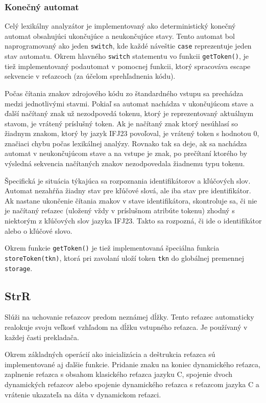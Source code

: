 \documentclass[a4paper,11pt]{article}
\begin{document}
\subsubsection{Konečný automat}
Celý lexikálny analyzátor je implementovaný ako deterministický konečný automat obsahujúci ukončujúce a neukončujúce stavy. Tento automat bol naprogramovaný ako jeden \texttt{switch}, kde každé náveštie \texttt{case} reprezentuje jeden stav automatu. Okrem hlavného \texttt{switch} statementu vo funkcii \texttt{getToken()}, je tiež implementovaný podautomat v pomocnej funkcii, ktorý spracováva escape sekvencie v reťazcoch (za účelom sprehľadnenia kódu).

Počas čítania znakov zdrojového kódu zo štandardného vstupu sa prechádza medzi jednotlivými stavmi. Pokiaľ sa automat nachádza v ukončujúcom stave a ďalší načítaný znak už nezodpovedá tokenu, ktorý je reprezentovaný aktuálnym stavom, je vrátený príslušný token. Ak je načítaný znak ktorý nesúhlasí so žiadnym znakom, ktorý by jazyk IFJ23 povoľoval, je vrátený token s hodnotou 0, značiaci chybu počas lexikálnej analýzy. Rovnako tak sa deje, ak sa nachádza automat v neukončujúcom stave a na vstupe je znak, po prečítaní ktorého by výsledná sekvencia načítaných znakov nezodpovedala žiadnemu typu tokenu.

Špecifická je situácia týkajúca sa rozpoznania identifikátorov a kľúčových slov. Automat nezahŕňa žiadny stav pre kľúčové slová, ale iba stav pre identifikátor. Ak nastane ukončenie čítania znakov v stave identifikátora, skontroluje sa, či nie je načítaný reťazec (uložený vždy v príslušnom atribúte tokenu) zhodný s niektorým z kľúčových slov jazyka IFJ23. Takto sa rozpozná, či ide o identifikátor alebo o kľúčové slovo.

Okrem funkcie \texttt{getToken()} je tiež implementovaná špeciálna funkcia \texttt{storeToken(tkn)}, ktorá pri zavolaní uloží token \texttt{tkn} do globálnej premennej \texttt{storage}.

\subsection{StrR}
Slúži na uchovanie reťazcov predom neznámej dĺžky. Tento reťazec automaticky
realokuje svoju veľkosť vzhľadom na dĺžku vstupného reťazca. Je používaný v
každej časti prekladača.

Okrem základných operácií ako inicializácia a deštrukcia reťazca sú implementované aj ďalšie
funkcie. Pridanie znaku na koniec dynamického reťazca, zaplnenie reťazca s obsahom
klasického reťazca jazyku C, spojenie dvoch dynamických reťazcov alebo spojenie
dynamického reťazca s reťazcom jazyka C a vrátenie ukazateľa na dáta v dynamickom reťazci.
\end{document}
